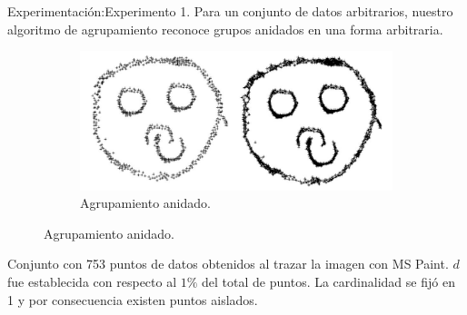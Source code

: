 
\begin{frame}[fragile]{Experimentación:}{Experimento 1.}
  Para un conjunto de datos arbitrarios, nuestro algoritmo de
  agrupamiento reconoce grupos anidados en una forma arbitraria.
  \begin{figure}
    \centering
    \begin{subfigure}[b]{0.6\textwidth}
      \includegraphics[width=\textwidth]{./Imagenes/Exp1.png}
      \caption*{Agrupamiento anidado.}
    \end{subfigure}
  \end{figure}
  Conjunto con 753 puntos de datos obtenidos al trazar la imagen con
  MS Paint. $d$ fue establecida con respecto al $1\%$ del total de puntos.
  La cardinalidad se fijó en 1 y por consecuencia existen puntos aislados.
\end{frame}
